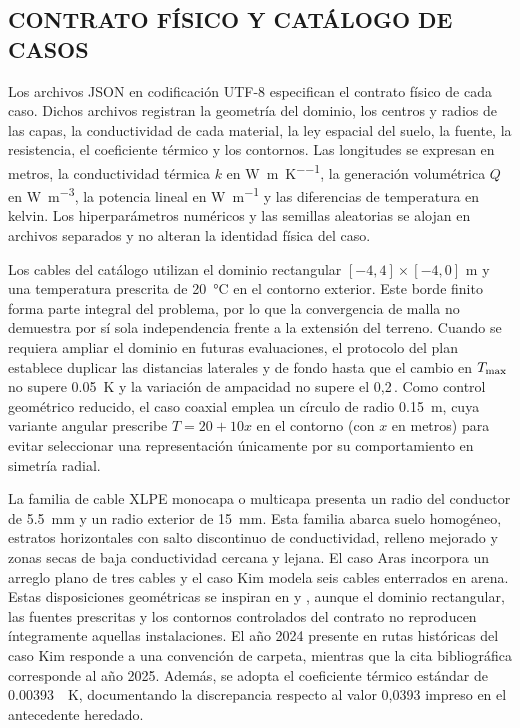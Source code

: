 \subsection{CONTRATO FÍSICO Y CATÁLOGO DE CASOS}

Los archivos JSON en codificación UTF-8 especifican el contrato físico de cada caso. Dichos archivos registran la geometría del dominio, los centros y radios de las capas, la conductividad de cada material, la ley espacial del suelo, la fuente, la resistencia, el coeficiente térmico y los contornos. Las longitudes se expresan en metros, la conductividad térmica $k$ en \si{\watt\per\metre\per\kelvin}, la generación volumétrica $Q$ en \si{\watt\per\metre\cubed}, la potencia lineal en \si{\watt\per\metre} y las diferencias de temperatura en kelvin. Los hiperparámetros numéricos y las semillas aleatorias se alojan en archivos separados y no alteran la identidad física del caso.

Los cables del catálogo utilizan el dominio rectangular $[-4,4]\times[-4,0]$ m y una temperatura prescrita de \SI{20}{\celsius} en el contorno exterior. Este borde finito forma parte integral del problema, por lo que la convergencia de malla no demuestra por sí sola independencia frente a la extensión del terreno. Cuando se requiera ampliar el dominio en futuras evaluaciones, el protocolo del plan establece duplicar las distancias laterales y de fondo hasta que el cambio en $T_{\max}$ no supere \SI{0,05}{\kelvin} y la variación de ampacidad no supere el 0,2\,\pct{}. Como control geométrico reducido, el caso coaxial emplea un círculo de radio \SI{0,15}{\metre}, cuya variante angular prescribe $T=20+10x$ en el contorno (con $x$ en metros) para evitar seleccionar una representación únicamente por su comportamiento en simetría radial.

La familia de cable XLPE monocapa o multicapa presenta un radio del conductor de \SI{5,5}{\milli\metre} y un radio exterior de \SI{15}{\milli\metre}. Esta familia abarca suelo homogéneo, estratos horizontales con salto discontinuo de conductividad, relleno mejorado y zonas secas de baja conductividad cercana y lejana. El caso Aras incorpora un arreglo plano de tres cables y el caso Kim modela seis cables enterrados en arena. Estas disposiciones geométricas se inspiran en \textcite{aras2005} y \textcite{kim2025}, aunque el dominio rectangular, las fuentes prescritas y los contornos controlados del contrato no reproducen íntegramente aquellas instalaciones. El año 2024 presente en rutas históricas del caso Kim responde a una convención de carpeta, mientras que la cita bibliográfica corresponde al año 2025. Además, se adopta el coeficiente térmico estándar de \SI{0,00393}{\per\kelvin}, documentando la discrepancia respecto al valor 0,0393 impreso en el antecedente heredado.

